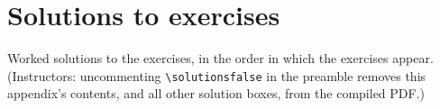 \documentclass[11pt]{article}
\begin{document}
\section{Solutions to exercises}
\label{app:solutions}

Worked solutions to the exercises, in the order in which the exercises appear. (Instructors: uncommenting \verb|\solutionsfalse| in the preamble removes this appendix's contents, and all other solution boxes, from the compiled PDF.)



































\end{document}
